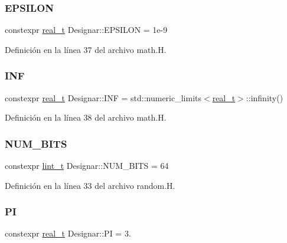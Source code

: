 \subsubsection{\texorpdfstring{E\+P\+S\+I\+L\+ON}{EPSILON}}
{\footnotesize\ttfamily constexpr \hyperlink{namespace_designar_aca2c32af26808dbec1f3a3071fad25ce}{real\+\_\+t} Designar\+::\+E\+P\+S\+I\+L\+ON = 1e-\/9}



Definición en la línea 37 del archivo math.\+H.

\mbox{\label{namespace_designar_a74903000a6e8d8117bb29540ef1d07ae}} 
\subsubsection{\texorpdfstring{I\+NF}{INF}}
{\footnotesize\ttfamily constexpr \hyperlink{namespace_designar_aca2c32af26808dbec1f3a3071fad25ce}{real\+\_\+t} Designar\+::\+I\+NF = std\+::numeric\+\_\+limits$<$\hyperlink{namespace_designar_aca2c32af26808dbec1f3a3071fad25ce}{real\+\_\+t}$>$\+::infinity()}



Definición en la línea 38 del archivo math.\+H.

\mbox{\label{namespace_designar_abb77bd8c0a61847409c6dcb779b66974}} 
\subsubsection{\texorpdfstring{N\+U\+M\+\_\+\+B\+I\+TS}{NUM\_BITS}}
{\footnotesize\ttfamily constexpr \hyperlink{namespace_designar_a9d113d66a39e82b73727c72cd3a52f73}{lint\+\_\+t} Designar\+::\+N\+U\+M\+\_\+\+B\+I\+TS = 64}



Definición en la línea 33 del archivo random.\+H.

\mbox{\label{namespace_designar_a2085e876f193b2212cd11dd2770b2d0b}} 
\subsubsection{\texorpdfstring{PI}{PI}}
{\footnotesize\ttfamily constexpr \hyperlink{namespace_designar_aca2c32af26808dbec1f3a3071fad25ce}{real\+\_\+t} Designar\+::\+PI = 3.}



